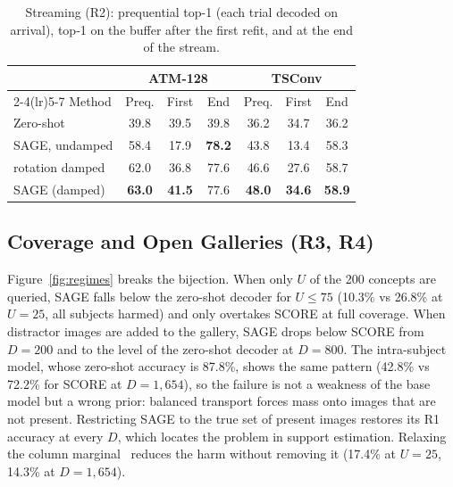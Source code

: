 \documentclass[10pt,twocolumn,letterpaper]{article}
\begin{document}
\begin{table}[t]
\caption{Streaming (R2): prequential top-1 (each trial decoded on arrival), top-1 on the buffer after the first refit, and at the end of the stream.}
\label{tab:stream}
\centering
\small
\setlength{\tabcolsep}{3.4pt}
\begin{tabular}{@{}lcccccc@{}}
\toprule
 & \multicolumn{3}{c}{ATM-128} & \multicolumn{3}{c}{TSConv} \\
\cmidrule(lr){2-4}\cmidrule(lr){5-7}
Method & Preq. & First & End & Preq. & First & End \\
\midrule
Zero-shot & 39.8 & 39.5 & 39.8 & 36.2 & 34.7 & 36.2 \\
SAGE, undamped & 58.4 & 17.9 & \textbf{78.2} & 43.8 & 13.4 & 58.3 \\
rotation damped & 62.0 & 36.8 & 77.6 & 46.6 & 27.6 & 58.7 \\
SAGE (damped) & \textbf{63.0} & \textbf{41.5} & 77.6 & \textbf{48.0} & \textbf{34.6} & \textbf{58.9} \\
\bottomrule
\end{tabular}
\end{table}

\subsection{Coverage and Open Galleries (R3, R4)}
\label{sec:regimes}

Figure~\ref{fig:regimes} breaks the bijection. When only $U$ of the 200 concepts are queried, SAGE falls below the zero-shot decoder for $U \leq 75$ (10.3\% vs 26.8\% at $U=25$, all subjects harmed) and only overtakes SCORE at full coverage. When distractor images are added to the gallery, SAGE drops below SCORE from $D=200$ and to the level of the zero-shot decoder at $D=800$. The intra-subject model, whose zero-shot accuracy is 87.8\%, shows the same pattern (42.8\% vs 72.2\% for SCORE at $D=1{,}654$), so the failure is not a weakness of the base model but a wrong prior: balanced transport forces mass onto images that are not present. Restricting SAGE to the true set of present images restores its R1 accuracy at every $D$, which locates the problem in support estimation. Relaxing the column marginal~\cite{chizat2018scaling} reduces the harm without removing it (17.4\% at $U=25$, 14.3\% at $D=1{,}654$).
\end{document}
